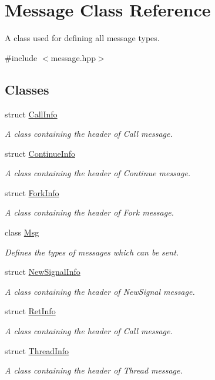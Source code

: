 \hypertarget{class_message}{}\section{Message Class Reference}
\label{class_message}


A class used for defining all message types.  




{\ttfamily \#include $<$message.\+hpp$>$}

\subsection*{Classes}
\begin{DoxyCompactItemize}
\item 
struct \hyperlink{struct_message_1_1_call_info}{Call\+Info}
\begin{DoxyCompactList}\small\item\em A class containing the header of Call message. \end{DoxyCompactList}\item 
struct \hyperlink{struct_message_1_1_continue_info}{Continue\+Info}
\begin{DoxyCompactList}\small\item\em A class containing the header of Continue message. \end{DoxyCompactList}\item 
struct \hyperlink{struct_message_1_1_fork_info}{Fork\+Info}
\begin{DoxyCompactList}\small\item\em A class containing the header of Fork message. \end{DoxyCompactList}\item 
class \hyperlink{class_message_1_1_msg}{Msg}
\begin{DoxyCompactList}\small\item\em Defines the types of messages which can be sent. \end{DoxyCompactList}\item 
struct \hyperlink{struct_message_1_1_new_signal_info}{New\+Signal\+Info}
\begin{DoxyCompactList}\small\item\em A class containing the header of New\+Signal message. \end{DoxyCompactList}\item 
struct \hyperlink{struct_message_1_1_ret_info}{Ret\+Info}
\begin{DoxyCompactList}\small\item\em A class containing the header of Call message. \end{DoxyCompactList}\item 
struct \hyperlink{struct_message_1_1_thread_info}{Thread\+Info}
\begin{DoxyCompactList}\small\item\em A class containing the header of Thread message. \end{DoxyCompactList}\end{DoxyCompactItemize}
